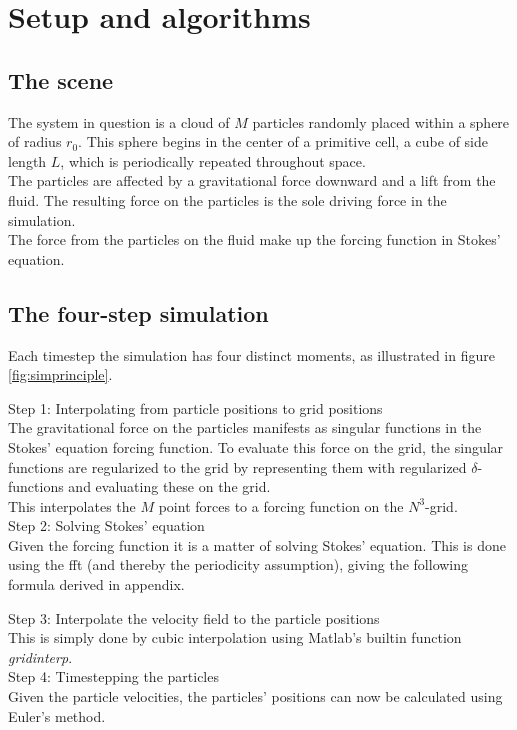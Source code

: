 \documentclass[a4paper,twoside=false,abstract=false,numbers=noenddot,
titlepage=false,headings=small,parskip=half,version=last]{scrartcl}
\begin{document}
\section{Setup and algorithms}
\subsection{The scene}
The system in question is a cloud of $M$ particles randomly placed within a sphere of radius $r_0$. This sphere begins in the center of a primitive cell, a cube of side length $L$, which is periodically repeated throughout space.\\
The particles are affected by a gravitational force downward and a lift from the fluid. The resulting force on the particles is the sole driving force in the simulation.\\
The force from the particles on the fluid make up the forcing function in Stokes' equation.
\subsection{The four-step simulation}

Each timestep the simulation has four distinct moments, as illustrated in figure \ref{fig:simprinciple}.

Step 1: Interpolating from particle positions to grid positions\\
The gravitational force on the particles manifests as singular functions in the Stokes' equation forcing function. To evaluate this force on the grid, the singular functions are regularized to the grid by representing them with regularized $\delta$-functions and evaluating these on the grid.\\ This interpolates the $M$ point forces to a forcing function on the $N^3$-grid.\\
Step 2: Solving Stokes' equation\\
Given the forcing function it is a matter of solving Stokes' equation. This is done using the fft (and thereby the periodicity assumption), giving the following formula derived in appendix.

Step 3: Interpolate the velocity field to the particle positions\\
This is simply done by cubic interpolation using Matlab's builtin function \emph{gridinterp}.\\
Step 4: Timestepping the particles\\
Given the particle velocities, the particles' positions can now be calculated using Euler's method.\\
\end{document}
